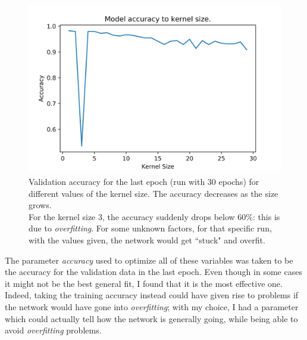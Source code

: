 \documentclass[12pt,a4paper,final]{book}			%
\begin{document}
				  \begin{figure}[h!]
				        \centering
				        \includegraphics[scale=0.5]{figures/kernels.png}
				        \caption{Validation accuracy for the last epoch (run with $30$ epochs) for different values of the kernel size. The accuracy decreases as the size grows. \\
				        For the kernel size $3$, the accuracy suddenly drops below $60\%$: this is due to \textit{overfitting}. For some unknown factors, for that specific run, with the values given, the network would get ``stuck" and overfit.}
			    \label{optimization_plot_kernel}				        
			    \end{figure}%
			  
					The parameter \textit{accuracy} used to optimize all of these variables was taken to be the accuracy for the validation data in the last epoch. Even though in some cases it might not be the best general fit, I found that it is the most effective one. Indeed, taking the training accuracy instead could have given rise to problems if the network would have gone into \textit{overfitting}; with my choice, I had a parameter which could actually tell  how the network is generally going, while being able to avoid \textit{overfitting} problems. 					
					
\end{document}
